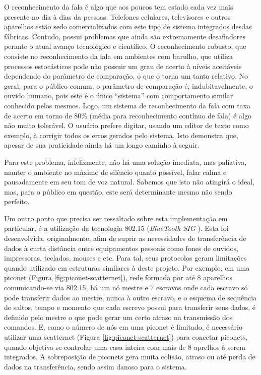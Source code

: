 \documentclass[12pt,a4paper,oneside]{report}
\begin{document}
O reconhecimento da fala é algo que aos poucos tem estado cada vez mais presente no dia à dias da pessoas. Telefones celulares, televisores e outros aparelhos estão sedo comercializados com este tipo de sistema integrados desdas fábricas. Contudo, possui problemas que ainda são extremamente desafiadores perante o atual avanço tecnológico e científico. O reconhecimento robusto, que consiste no reconhecimento da fala em ambientes com barulho, que utiliza processos estocásticos pode não possuir um grau de acerto à níveis aceitáveis dependendo do parâmetro de comparação, o que o torna um tanto relativo. No geral, para o público comum, o parâmetro de comparação é, indubitavelmente, o ouvido humano, pois este é o único ``sistema'' com comportamento similar conhecido pelos mesmos. Logo, um sistema de reconhecimento da fala com taxa de acerto em torno de 80\% (média para reconhecimento contínuo de fala) é algo não muito tolerável. O usuário prefere digitar, usando um editor de texto como exemplo, à corrigir todos os erros gerados pelo sistema. Isto demonstra que, apesar de sua praticidade ainda há um longo caminho à seguir.

Para este problema, infelizmente, não há uma solução imediata, mas paliativa, manter o ambiente no máximo de silêncio quanto possível, falar calma e pausadamente em seu tom de voz natural. Sabemos que isto não atingirá o ideal, mas, para o público em questão, este será determinante mesmo não sendo perfeito.

Um outro ponto que precisa ser ressaltado sobre esta implementação em particular, é a utilização da tecnologia 802.15 (\emph{BlueTooth SIG} \cite{bluetooth}). Esta foi desenvolvida, originalmente, afim de suprir as necessidades de transferência de dados à curta distância entre equipamentos pessoais como fones de ouvidos, impressoras, teclados, mouses e etc. Para tal, seus protocolos geram limitações quando utilizado em estruturas similares à deste projeto. Por exemplo, em uma piconet (Figura \ref{fig:piconet-scatternet}), rede formada por até 8 aparelhos comunicando-se via 802.15, há um nó mestre e 7 escravos onde cada escravo só pode transferir dados ao mestre, nunca à outro escravo, e o esquema de sequência de saltos, tempo e momento que cada escrevo possui para transferir seus dados, é definido pelo mestre o que pode gerar um certo atraso na transmissão dos comandos. E, como o número de nós em uma piconet é limitado, é necessário utilizar uma scatternet (Figura \ref{fig:piconet-scatternet}) para conectar piconets, quando objetiva-se controlar uma casa inteira com mais de 8 aprelhos à serem integrados. A sobreposição de piconets gera muita colisão, atraso ou até perda de dados na transferência, sendo assim danoso para o sistema.
\end{document}
